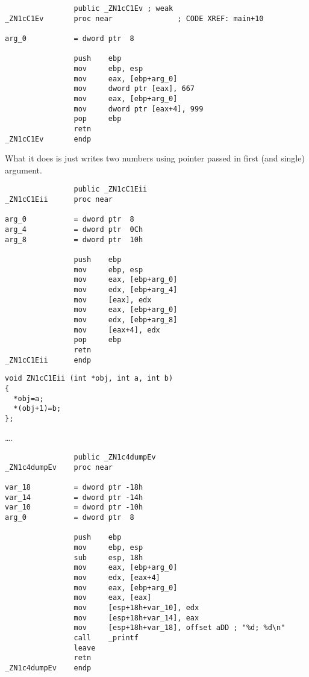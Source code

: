 \begin{lstlisting}
                public _ZN1cC1Ev ; weak
_ZN1cC1Ev       proc near               ; CODE XREF: main+10

arg_0           = dword ptr  8

                push    ebp
                mov     ebp, esp
                mov     eax, [ebp+arg_0]
                mov     dword ptr [eax], 667
                mov     eax, [ebp+arg_0]
                mov     dword ptr [eax+4], 999
                pop     ebp
                retn
_ZN1cC1Ev       endp
\end{lstlisting}

{What it does is just writes two numbers using pointer passed in first (and single) argument.}


\begin{lstlisting}
                public _ZN1cC1Eii
_ZN1cC1Eii      proc near

arg_0           = dword ptr  8
arg_4           = dword ptr  0Ch
arg_8           = dword ptr  10h

                push    ebp
                mov     ebp, esp
                mov     eax, [ebp+arg_0]
                mov     edx, [ebp+arg_4]
                mov     [eax], edx
                mov     eax, [ebp+arg_0]
                mov     edx, [ebp+arg_8]
                mov     [eax+4], edx
                pop     ebp
                retn
_ZN1cC1Eii      endp
\end{lstlisting}


\begin{lstlisting}
void ZN1cC1Eii (int *obj, int a, int b)
{
  *obj=a;
  *(obj+1)=b;
};
\end{lstlisting}

\dots {}.


\begin{lstlisting}
                public _ZN1c4dumpEv
_ZN1c4dumpEv    proc near

var_18          = dword ptr -18h
var_14          = dword ptr -14h
var_10          = dword ptr -10h
arg_0           = dword ptr  8

                push    ebp
                mov     ebp, esp
                sub     esp, 18h
                mov     eax, [ebp+arg_0]
                mov     edx, [eax+4]
                mov     eax, [ebp+arg_0]
                mov     eax, [eax]
                mov     [esp+18h+var_10], edx
                mov     [esp+18h+var_14], eax
                mov     [esp+18h+var_18], offset aDD ; "%d; %d\n"
                call    _printf
                leave
                retn
_ZN1c4dumpEv    endp
\end{lstlisting}

